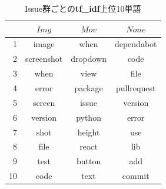 \begin{table}[t]
  \begin{center}
  \caption{Issue群ごとの\textbf{tf\_idf}上位10単語}
  \begin{tabular}{r | c c c }
     & $Img$ & $Mov$ & $None$\\
    \hline \hline
    1 & image & when & dependabot\\
    2 & screenshot & dropdown & code\\
    3 & when & view & file\\
    4 & error & package & pullrequest\\
    5 & screen & issue & version\\
    6 & version & python & error\\
    7 & shot & height & use\\
    8 & file & react & lib\\
    9 & test & button & add\\
    10& code & text & commit\\
  \end{tabular}\\
  \label{tf-idf_result}
  \end{center}
\end{table}